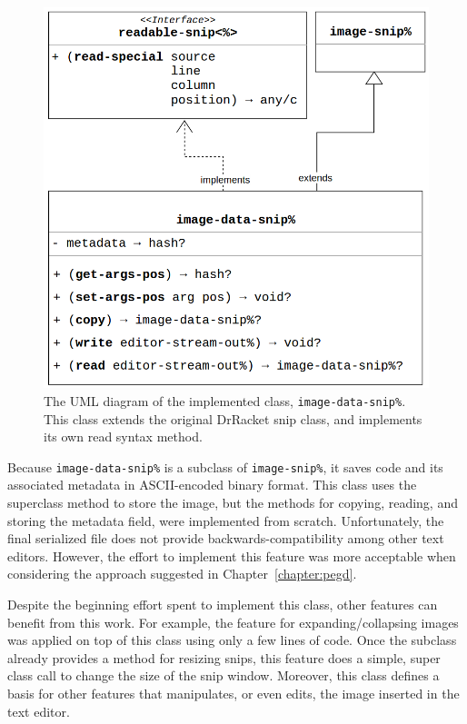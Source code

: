 \begin{figure}[!h]
    \centering
    \includegraphics[scale=0.25]{images/img-data-snip}
    \caption{The UML diagram of the implemented class, \texttt{image-data-snip\%}. This class extends the original DrRacket snip class, and implements its own read syntax method.}
    \label{fig:img-data-snip}
\end{figure}

Because \texttt{image-data-snip\%} is a subclass of \texttt{image-snip\%}, it saves code and its associated metadata in ASCII-encoded binary format. This class uses the superclass method to store the image, but the methods for copying, reading, and storing the metadata field, were implemented from scratch. Unfortunately, the final serialized file does not provide backwards-compatibility among other text editors. However, the effort to implement this feature was more acceptable when considering the approach suggested in Chapter~\ref{chapter:pegd}.

Despite the beginning effort spent to implement this class, other features can benefit from this work. For example, the feature for expanding/collapsing images was applied on top of this class using only a few lines of code. Once the subclass already provides a method for resizing snips, this feature does a simple, super class call to change the size of the snip window. Moreover, this class defines a basis for other features that manipulates, or even edits, the image inserted in the text editor. 

